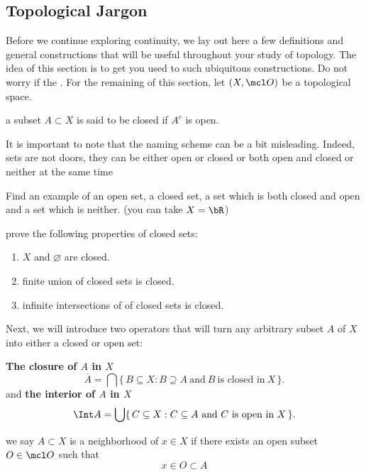 \documentclass{pset}
\begin{document}
\maketitle

\pagebreak

\subsection{Topological Jargon}
Before we continue exploring continuity, we lay out here a few definitions and general constructions that will be useful throughout your study of 
topology. The idea of this section is to get you used to such ubiquitous constructions. Do not worry if the . For the remaining of this section, let $(X, \mcl O)$ be a topological space.
\begin{definition}
    a subset $A\subset X$ is said to be closed if $A^c$ is open.
\end{definition}
It is important to note that the naming scheme can be a bit misleading. Indeed, sets are not doors, they can be either open or closed or both open 
and closed or neither at the same time
\begin{exercise}[\skipforward]
    Find an example of an open set, a closed set, a set which is both closed and open and a set which is neither. (you can take $X=\bR$)
\end{exercise}
\begin{exercise}
    prove the following properties of closed sets:
    \begin{enumerate}[label=\roman*.]
        \item $X$ and $\varnothing$ are closed.
        \item finite union of closed sets is closed.
        \item infinite intersections of of closed sets is closed.
    \end{enumerate}
\end{exercise}
Next, we will introduce two operators that will turn any arbitrary subset $A$ of $X$ into either a closed or open set: 
\begin{definition}
    \textbf{The closure of $A$ in $X$}
    \[
    \overline{A} = \bigcap \{\, B \subseteq X : B \supseteq A \ \text{and}\ B \ \text{is closed in}\ X \,\}.
    \]
    and \textbf{the interior of $A$ in $X$}
    \[
    \Int A = \bigcup \{\, C \subseteq X : C \subseteq A \ \text{and}\ C \ \text{is open in}\ X \,\}.
    \]
\end{definition}
\begin{definition}
    we say $A\subset X$ is a neighborhood of $x\in X$ if there exists an open subset $O\in \mcl O$ such that
    \[x\in O\subset A\]
\end{definition}
\end{document}
